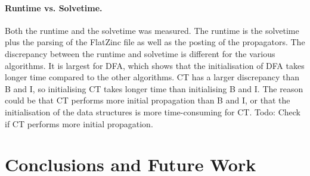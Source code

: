 \documentclass[a4paper,11pt]{article}
\newcommand{\Todo}[1]{{\color{blue}#1}}
\newcommand{\CTpaper}[0]{DBLP:conf/cp/DemeulenaereHLP16}
\numberwithin{equation}{section}
\begin{document}
\paragraph{Runtime vs. Solvetime.}
Both the runtime and the solvetime was measured. The runtime is the solvetime
plus the parsing of the FlatZinc file as well as the posting of the propagators.
The discrepancy between the runtime and solvetime is different for the various
algorithms. It is largest for DFA, which shows that the initialisation of DFA
takes longer time compared to the other algorithms.
CT has a larger discrepancy than B and I, so initialising CT takes longer time
than initialising B and I. The reason could be that CT performs more initial propagation
than B and I, or that the initialisation of the data structures is more time-consuming
for CT. \Todo{Todo: Check if CT performs more initial propagation}.










\section{Conclusions and Future Work}
\label{conclusions}
\end{document}
